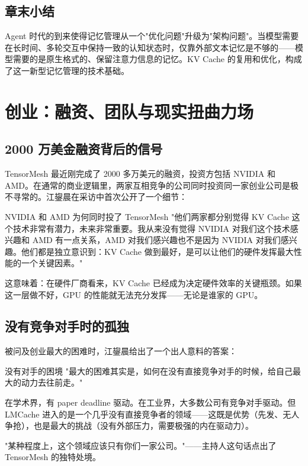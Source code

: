 \documentclass[a4paper]{article}
\begin{document}
\subsection{章末小结}

Agent 时代的到来使得记忆管理从一个"优化问题"升级为"架构问题"。当模型需要在长时间、多轮交互中保持一致的认知状态时，仅靠外部文本记忆是不够的——模型需要的是原生格式的、保留注意力信息的记忆。KV Cache 的复用和优化，构成了这一新型记忆管理的技术基础。

\section{创业：融资、团队与现实扭曲力场}

\subsection{2000 万美金融资背后的信号}

TensorMesh 最近刚完成了 2000 多万美元的融资，投资方包括 NVIDIA 和 AMD。在通常的商业逻辑里，两家互相竞争的公司同时投资同一家创业公司是极不寻常的。江鋆晨在采访中首次公开了一个细节：

\begin{importantbox}{NVIDIA 和 AMD 为何同时投了 TensorMesh}
"他们两家都分别觉得 KV Cache 这个技术非常有潜力，未来非常重要。我从来没有觉得 NVIDIA 对我们这个技术感兴趣和 AMD 有一点关系，AMD 对我们感兴趣也不是因为 NVIDIA 对我们感兴趣。他们都是独立意识到：KV Cache 做到最好，是可以让他们的硬件发挥最大性能的一个关键因素。"

这意味着：在硬件厂商看来，KV Cache 已经成为决定硬件效率的关键瓶颈。如果这一层做不好，GPU 的性能就无法充分发挥——无论是谁家的 GPU。
\end{importantbox}

\subsection{没有竞争对手时的孤独}

被问及创业最大的困难时，江鋆晨给出了一个出人意料的答案：

\begin{warningbox}{没有对手的困境}
"最大的困难其实是，如何在没有直接竞争对手的时候，给自己最大的动力去往前走。"

在学术界，有 paper deadline 驱动。在工业界，大多数公司有竞争对手驱动。但 LMCache 进入的是一个几乎没有直接竞争者的领域——这既是优势（先发、无人争抢），也是最大的挑战（没有外部压力，需要极强的内在驱动力）。

"某种程度上，这个领域应该只有你们一家公司。"——主持人这句话点出了 TensorMesh 的独特处境。
\end{warningbox}
\end{document}
